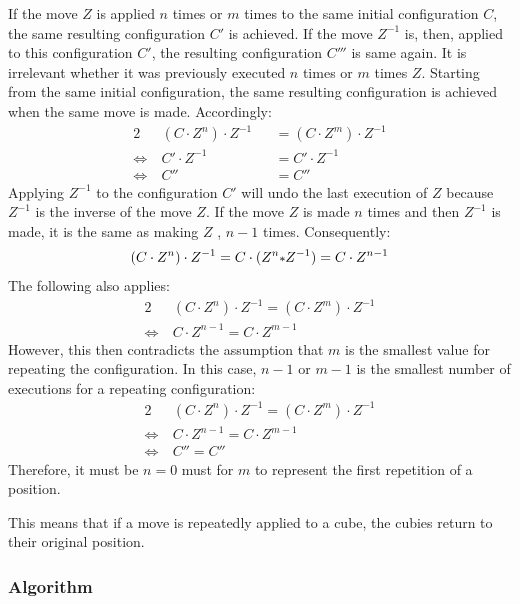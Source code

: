 If the move $Z$ is applied $n$ times or $m$ times to the same initial configuration $C$, the same resulting configuration $C'$ is achieved.
If the move $Z^{-1}$ is, then, applied to this configuration $C'$, the resulting configuration $C'''$ is  same again. It is irrelevant whether it was previously executed $n$ times or $m$ times $Z$. Starting from the same initial configuration, the same resulting configuration is achieved when the same move is made. Accordingly:
\begin{alignat*}{2}
\ &(C \cdot Z^n) \cdot Z^{-1} && = (C \cdot Z^m) \cdot Z^{-1} \\
\Leftrightarrow \ & C' \cdot Z^{-1} && = C' \cdot Z^{-1} \\
\Leftrightarrow \ & C'' && = C ''
\end{alignat*}
Applying $Z^{-1}$ to the configuration $C'$ will undo the last execution of $Z$ because $Z^{-1}$ is the inverse of the move $Z$. If the move $Z$ is made $n$ times and then $Z^{-1}$ is made, it is the same as making $Z$ , $n-1$ times. Consequently:
\begin{align*}
(C \cdot Z^n) \cdot Z^{-1}=C \cdot (Z^n \mathlarger{\scriptstyle*}  Z^{-1})=C \cdot Z^{n-1}
\end{align*}
The following also applies:
\begin{alignat*}{2}
 & (C \cdot Z^n) \cdot Z^{-1}  = (C \cdot Z^m) \cdot Z^{-1} \\
\Leftrightarrow \ & C \cdot Z^{n-1}  = C \cdot Z^{m-1}
\end{alignat*}
However, this then contradicts the assumption that $m$ is the smallest value for repeating the configuration. In this case, $n-1$ or $m-1$ is the smallest number of executions for a repeating configuration:
\begin{alignat*}{2}
 & (C \cdot Z^n) \cdot Z^{-1}  = (C \cdot Z^m) \cdot Z^{-1} \\
\Leftrightarrow \ & C \cdot Z^{n-1}  = C \cdot Z^{m-1} \\
\Leftrightarrow \ & C''  = C''
\end{alignat*}
Therefore, it must be $n=0$ must for $m$ to represent the first repetition of a position.

This means that if a move is repeatedly applied to a cube, the cubies return to their original position.

\subsubsection*{Algorithm}


